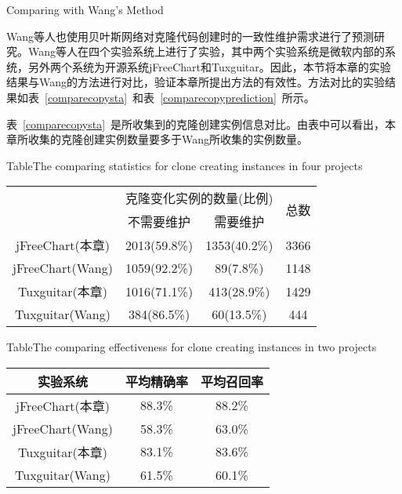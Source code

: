 {Comparing with Wang’s Method}

Wang\cite{wang2014predicting}等人也使用贝叶斯网络对克隆代码创建时的一致性维护需求进行了预测研究。Wang等人在四个实验系统上进行了实验，其中两个实验系统是微软内部的系统，另外两个系统为开源系统jFreeChart和Tuxguitar。因此，本节将本章的实验结果与Wang的方法进行对比，验证本章所提出方法的有效性。方法对比的实验结果如表~\ref{comparecopysta}~和表~\ref{comparecopyprediction}~所示。

表~\ref{comparecopysta}~是所收集到的克隆创建实例信息对比。由表中可以看出，本章所收集的克隆创建实例数量要多于Wang所收集的实例数量。

\begin{table}[htbp]
{Table$\!$}{The comparing statistics for clone creating instances in four projects}
\vspace{0.5em}
\centering
\wuhao
\begin{tabular}{cccc}
\toprule[1.5pt]
~\multirow{2}{*}{实验系统}& \multicolumn{2}{c}{克隆变化实例的数量(比例)} & \multirow{2}{*}{总数}\\ 
 \cline{2-3}
~&{不需要维护} &{需要维护} & ~\\
\midrule[1pt]
jFreeChart(本章)&	2013(59.8\%)&	1353(40.2\%)&	3366\\
jFreeChart(Wang)&1059(92.2\%)&	89(7.8\%)&	1148\\
Tuxguitar(本章)&	1016(71.1\%)&	413(28.9\%)&	1429\\
Tuxguitar(Wang)&384(86.5\%)&	60(13.5\%)&	444\\
\bottomrule[1.5pt]
\end{tabular}
\end{table}

\begin{table}[htbp]
{Table$\!$}{The comparing effectiveness for clone creating instances in two projects}
\vspace{0.5em}
\centering
\wuhao
\begin{tabular}{ccc}
\toprule[1.5pt]
{实验系统}&{平均精确率} &{平均召回率}\\ 
\midrule[1pt]
jFreeChart(本章)&	88.3\%& 88.2\%\\
jFreeChart(Wang)&58.3\%&	63.0\%\\
Tuxguitar(本章)&	83.1\%&	83.6\%\\
Tuxguitar(Wang)&61.5\%&	60.1\%\\
\bottomrule[1.5pt]
\end{tabular}
\end{table}

